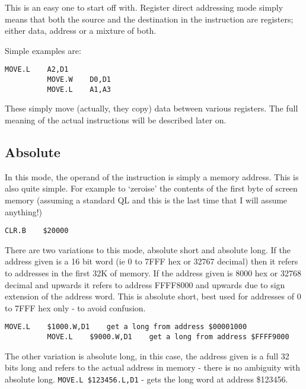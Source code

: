 This is an easy one to start off with. Register direct addressing
      mode simply means that both the source and the destination in the
      instruction are registers; either data, address or a mixture of
      both.

Simple examples are:

\begin{lstlisting}[firstnumber=1,]
          MOVE.L    A2,D1
          MOVE.W    D0,D1
          MOVE.L    A1,A3 
\end{lstlisting}

These simply move (actually, they copy) data between various
      registers. The full meaning of the actual instructions will be described
      later on.

\subsection{Absolute}\address{Absolute}

In this mode, the operand of the instruction is simply a memory
      address. This is also quite simple. For example to `zeroise' the
      contents of the first byte of screen memory (assuming a standard QL and
      this is the last time that I will assume anything!)

\begin{lstlisting}[firstnumber=1,]
          CLR.B    $20000  
\end{lstlisting}

There are two variations to this mode, absolute short and absolute
      long. If the address given is a 16 bit word (ie 0 to 7FFF hex or 32767
      decimal) then it refers to addresses in the first 32K of memory. If the
      address given is 8000 hex or 32768 decimal and upwards it refers to
      address FFFF8000 and upwards due to sign extension of the address word.
      This is absolute short, best used for addresses of 0 to 7FFF hex only -{}
      to avoid confusion.

\begin{lstlisting}[firstnumber=1,]
          MOVE.L    $1000.W,D1    get a long from address $00001000
          MOVE.L    $9000.W,D1    get a long from address $FFFF9000  
\end{lstlisting}

The other variation is absolute long, in this case, the address
      given is a full 32 bits long and refers to the actual address in memory
      -{} there is no ambiguity with absolute long. \lstinline{MOVE.L $123456.L,D1} -{} gets the
      long word at address \$123456.

